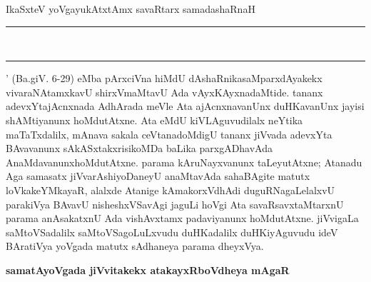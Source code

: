 IkaSxteV yoVga\-yukAtxtAmx savaRtarx samadashaRnaH {\rm \rule{.029cm}{.2cm}}~{\rm \rule{.029cm}{.2cm}} ' (Ba.giV. {\rm 6-29}) eMba pArxciVna hiMdU dAshaRnika\break saMparxdAyakekx vivaraNAtamxkavU shirxVmaMtavU Ada vAyxKAyxnadaMtide. tananx adevxYta\break jAcnxnada AdhArada meVle Ata ajAcnxnavanUnx duHKavanUnx jayisi shAMti\-yanunx hoMdu\-tAtxne. Ata eMdU kiVLAguvudilalx neYtika maTaTxdalilx, mAnava sakala ceVtanadoMdigU tananx jiVvada adevxYta BAvavanunx sAkASxtakxrisikoMDa baLika parxgADha\-vAda AnaMdavanunx\break hoMdu\-tAtxne. parama kAruNayxvanunx taLeyutAtxne; Atanadu Aga samasatx jiVvarAshi\-yoDaneyU anaMtavAda sahaBAgite matutx loVkakeYMkayaR, alalxde Atanige kAma\-korxVdhAdi duguRNagaLelalxvU parakiVya BAvavU nisheshxVSavAgi jaguLi hoVgi Ata savaRsavxtaMtarxnU parama anAsakatxnU Ada vishAvxtamx padaviyanunx hoMdu\-tAtxne. jiVvi\-gaLa saMtoVSadalilx saMtoVSagoLuLxvudu duHKadalilx duHKiyAguvudu ideV BAra\-tiVya yoVgada matutx sAdhaneya parama dheyxVya.

\bigskip
\begin{center}
{\Large\bf samatAyoVgada jiVvitakekx atakayxRboVdheya mAgaR}
\end{center}

